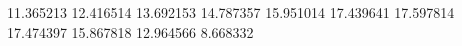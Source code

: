 11.365213
12.416514
13.692153
14.787357
15.951014
17.439641
17.597814
17.474397
15.867818
12.964566
8.668332

